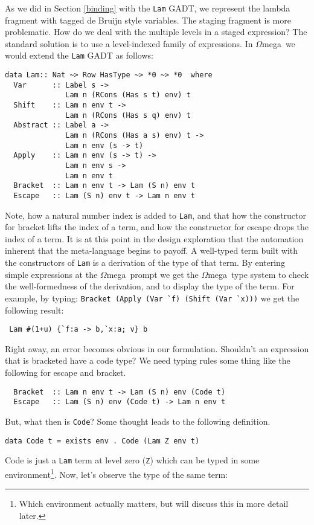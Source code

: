 \documentclass{sigplanconf}
\newcommand{\om}{$\Omega$mega}
\begin{document}
As we did in Section \ref{binding} with the {\tt Lam} GADT, we represent the 
lambda fragment with tagged de Bruijn style variables. The staging fragment
is more problematic. How do we deal with the multiple levels in
a staged expression? The standard solution\cite{T00,Taha99} is to use a level-indexed
family of expressions. In \om\ we would extend the {\tt Lam}
GADT as follows:
\begin{verbatim}
data Lam:: Nat ~> Row HasType ~> *0 ~> *0  where
  Var      :: Label s -> 
              Lam n (RCons (Has s t) env) t
  Shift    :: Lam n env t -> 
              Lam n (RCons (Has s q) env) t
  Abstract :: Label a -> 
              Lam n (RCons (Has a s) env) t -> 
              Lam n env (s -> t)
  Apply    :: Lam n env (s -> t) -> 
              Lam n env s -> 
              Lam n env t
  Bracket  :: Lam n env t -> Lam (S n) env t
  Escape   :: Lam (S n) env t -> Lam n env t
\end{verbatim} 
Note, how a natural number index is added to {\tt Lam}, and that how the
constructor for bracket lifts the index of a term, and how
the constructor for escape drops the index of a term. It is at this point
 in the design exploration that the automation inherent that the meta-language
 begins to payoff. A well-typed term built with the constructors of {\tt Lam}
 is a derivation of the type of that term. 
 By entering simple expressions at the \om\ prompt we get
 the \om\ type system to check the well-formedness of the derivation, and to display the type of the term.
 For example, by typing: \verb+Bracket (Apply (Var `f) (Shift (Var `x)))+
 we get the following result:
 \begin{verbatim}
 Lam #(1+u) {`f:a -> b,`x:a; v} b
 \end{verbatim}
Right away, an error becomes obvious in our formulation. Shouldn't an
expression that is bracketed have a code type? We need typing rules some thing
like the following for escape and bracket.
\begin{verbatim}
  Bracket  :: Lam n env t -> Lam (S n) env (Code t)
  Escape   :: Lam (S n) env (Code t) -> Lam n env t
\end{verbatim} 
But, what then is {\tt Code}? Some thought leads to the following definition.
\begin{verbatim}
data Code t = exists env . Code (Lam Z env t)
\end{verbatim}
Code is just a {\tt Lam} term at level zero ({\tt Z}) which can be typed in
some environment\footnote{Which environment actually matters, but will discuss
this in more detail later.}.  Now, let's observe the type of the same term:
\end{document}
